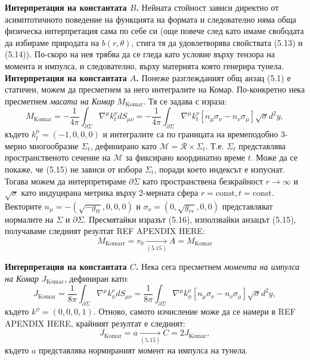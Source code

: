 \textbf{Интерпретация на константата $B$.} Нейната стойност зависи директно от асимптотичното поведение на функцията на формата и следователно няма обща физическа интерпретация сама по себе си (още повече след като имаме свободата да избираме природата на $b(r,\theta)$, стига тя да удовлетворява свойствата (5.13) и (5.14)). По-скоро на нея трябва да се гледа като условие върху тензора на момента и импулса, и следователно, върху материята която генерира тунела.\\

\textbf{Интерпретация на константата $A$.} Понеже разглежданият общ анзац (5.1) е статичен, можем да пресметнем за него интегралите на Комар. По-конкретно нека пресметнем \emph{масата на Комар} $M_{\text{Komar}}$. Тя се задава с израза:
\begin{equation}
	M_{\text{Komar}} = -\frac{1}{4\pi}\int_{\partial\Sigma}\nabla^\mu k^\nu_t dS_{\mu\nu} =  -\frac{1}{4\pi}\int_{\partial\Sigma}\nabla^\mu k^\nu_t\left[n_\mu\sigma_\nu - n_\nu\sigma_\mu\right] \sqrt{\sigma}d^2y,
\end{equation}
където $k^\mu_t = (-1,0,0,0)$ и интегралите са по границата на времеподобно 3-мерно многообразие $\Sigma_t$, дефинирано като $\mathcal{M} = \mathcal{R} \times \Sigma_t$. Т.е. $\Sigma_t$ представлява пространственото сечение на $\mathcal{M}$ за фиксирано координатно време $t$. Може да се покаже, че (5.15) не зависи от избора $\Sigma_t$, поради което индексът е изпуснат. Тогава можем да интерпретираме $\partial\Sigma$ като пространствена безкрайност $r\rightarrow\infty$ и $\sqrt{\sigma}$ като индуцирана метрика върху 2-мерната сфера $r = \text{const}, t = \text{const}$. Векторите $n_\mu = - (\sqrt{-g_{tt}}, 0, 0, 0)$ и $\sigma_\nu = (0, \sqrt{g_{rr}},0 ,0)$ представляват нормалите на $\Sigma$ и $\partial\Sigma$. Пресмятайки изразът (5.16), използвайки анзацът (5.15), получаваме следният резултат REF APENDIX HERE:
\begin{equation}
	M_{\text{Komarr}} = r_0 \xrightarrow[(5.15)]{} A = M_{\text{Komar}}
\end{equation}

\textbf{Интерпретация на константата $C$.} Нека сега пресметнем \emph{момента на импулса на Комар} $J_{\text{Komar}}$, дефиниран като:
\begin{equation}
	J_{\text{Komar}} = \frac{1}{8\pi}\int_{\partial\Sigma}\nabla^\mu k^\nu_\phi dS_{\mu\nu} = \frac{1}{8\pi}\int_{\partial\Sigma}\nabla^\mu k^\nu_\phi\left[n_\mu\sigma_\nu - n_\nu\sigma_\mu\right] \sqrt{\sigma}d^2y,
\end{equation}
където $k^\phi = (0, 0, 0, 1)$. Отново, самото изчисление може да се намери в REF APENDIX HERE, крайният резултат е следният:
\begin{equation}
	J_\text{Komar} = a\xrightarrow[(5.15)]{} C = 2J_\text{Komar}, 
\end{equation}
където $a$ представлява нормираният момент на импулса на тунела.
